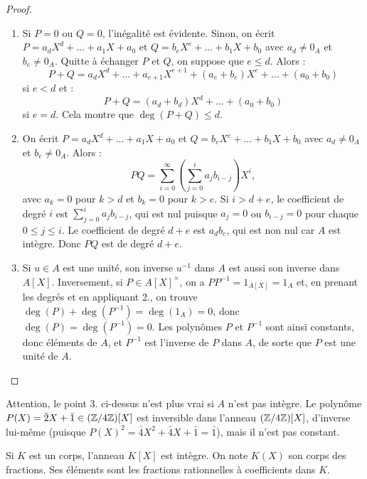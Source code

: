 \documentclass[]{report}
\begin{document}
\begin{proof}
    \begin{enumerate}
        \item Si $P = 0$ ou $Q = 0$, l'inégalité est évidente. Sinon, on écrit $P = a_d X^d + \dots + a_1 X + a_0$ et $Q = b_e X^e + \dots + b_1 X + b_0$ avec $a_d \neq 0_A$ et $b_e \neq 0_A$. Quitte à échanger $P$ et $Q$, on suppose que $e \le d$. Alors :
        \[P + Q = a_d X^d + \dots + a_{e+1} X^{e+1} + (a_e + b_e) X^e + \dots + (a_0 + b_0)\]
        si $e < d$ et :
        \[P + Q = (a_d + b_d) X^d + \dots + (a_0 + b_0)\]
        si $e = d$. Cela montre que $\deg(P + Q) \le d$.
        \item On écrit $P = a_d X^d + \dots + a_1 X + a_0$ et $Q = b_e X^e + \dots + b_1 X + b_0$ avec $a_d \neq 0_A$ et $b_e \neq 0_A$. Alors :
        \[PQ = \sum_{i=0}^{\infty} \left( \sum_{j=0}^{i} a_j b_{i-j} \right) X^i,\]
        avec $a_k = 0$ pour $k > d$ et $b_k = 0$ pour $k > e$. Si $i > d + e$, le coefficient de degré $i$ est $\sum_{j=0}^{i} a_j b_{i-j}$, qui est nul puisque $a_j = 0$ ou $b_{i-j} = 0$ pour chaque $0 \le j \le i$. Le coefficient de degré $d + e$ est $a_d b_e$, qui est non nul car $A$ est intègre. Donc $PQ$ est de degré $d + e$.
        \item Si $u \in A$ est une unité, son inverse $u^{-1}$ dans $A$ est aussi son inverse dans $A[X]$. Inversement, si $P \in A[X]^{\times}$, on a $PP^{-1} = 1_{A[X]} = 1_A$ et, en prenant les degrés et en appliquant 2., on trouve $\deg(P) + \deg(P^{-1}) = \deg(1_A) = 0$, donc $\deg(P) = \deg(P^{-1}) = 0$. Les polynômes $P$ et $P^{-1}$ sont ainsi constants, donc éléments de $A$, et $P^{-1}$ est l'inverse de $P$ dans $A$, de sorte que $P$ est une unité de $A$.
    \end{enumerate}
\end{proof}

\begin{re}{}{}
    Attention, le point 3. ci-dessus n'est plus vrai si $A$ n'est pas intègre. Le polynôme $P(X) = \bar{2}X + \bar{1} \in (\mathbb{Z}/4\mathbb{Z})[X]$ est inversible dans l'anneau $(\mathbb{Z}/4\mathbb{Z})[X]$, d'inverse lui-même (puisque $P(X)^2 = \bar{4}X^2 + \bar{4}X + \bar{1} = \bar{1}$), mais il n'est pas constant.
\end{re}

\begin{df}{}{}
    Si $K$ est un corps, l'anneau $K[X]$ est intègre. On note $K(X)$ son corps des fractions. Ses éléments sont les fractions rationnelles à coefficients dans $K$.
\end{df}
\end{document}
